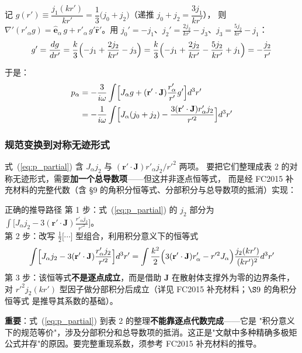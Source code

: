 记 $g(r')\equiv\dfrac{j_1(kr')}{kr'}=\dfrac13\bigl(j_0+j_2\bigr)$（递推 $j_0+j_2=\dfrac{3j_1}{kr'}$），
则 $\nabla'(r'_\alpha g)=\hat{\mathbf{e}}_\alpha\,g + r'_\alpha\,g'\hat{\mathbf{r}}'$。用
$j_0'=-j_1$、$j_2'=\frac{2j_2}{kr'}-j_3$、$j_3=\frac{5j_2}{kr'}-j_1$：
\begin{equation}
  g' = \frac{dg}{dr'} = \frac{k}{3}\Bigl(-j_1+\frac{2j_2}{kr'}-j_3\Bigr)
     = \frac{k}{3}\Bigl(-j_1+\frac{2j_2}{kr'}-\frac{5j_2}{kr'}+j_1\Bigr)
     = -\frac{j_2}{r'}
\end{equation}

于是：
\begin{align}
  p_\alpha &= -\frac{3}{i\omega}\int\Bigl[
    J_\alpha g + (\mathbf{r}'\cdot\mathbf{J})\frac{r'_\alpha}{r'}g'\Bigr]d^3r' \notag\\
  &= -\frac{1}{i\omega}\int\Bigl[
    J_\alpha(j_0+j_2) - \frac{3(\mathbf{r}'\cdot\mathbf{J})r'_\alpha j_2}{r'^2}\Bigr]d^3r'
  \label{eq:p_partial}
\end{align}

\subsubsection{规范变换到对称无迹形式}

式~(\ref{eq:p_partial}) 含 $J_\alpha j_2$ 与 $(\mathbf{r}'\cdot\mathbf{J})r'_\alpha j_2/r'^2$ 两项。
要把它们整理成表 2 的对称无迹形式，需要\textbf{加一个总导数项}——但这并非逐点恒等式，
而是经 FC2015 补充材料的完整代数（含 \S9 的角积分恒等式、分部积分与总导数项的抵消）实现：

\begin{stepbox}{正确的推导路径}
第 1 步：式~(\ref{eq:p_partial}) 的 $j_2$ 部分为 $\int\bigl[J_\alpha j_2 - 3(\mathbf{r}'\cdot\mathbf{J})\frac{r'_\alpha j_2}{r'^2}\bigr]$。\\
第 2 步：改写 $\frac{1}{2}\bigl[\cdots\bigr]$ 型组合，利用积分意义下的恒等式
$$
\int\Bigl[J_\alpha j_2 - 3(\mathbf{r}'\cdot\mathbf{J})\frac{r'_\alpha j_2}{r'^2}\Bigr]d^3r'
= \int\frac{k^2}{2}\Bigl(3(\mathbf{r}'\cdot\mathbf{J})r'_\alpha - r'^2J_\alpha\Bigr)\frac{j_2(kr')}{(kr')^2}d^3r'
$$
第 3 步：该恒等式\textbf{不是逐点成立}，而是借助 $\mathbf{J}$ 在散射体支撑外为零的边界条件，
对 $r'^2j_2(kr')$ 型因子做分部积分后成立（详见 FC2015 补充材料；$\S9$ 的角积分恒等式
是推导其系数的基础）。
\end{stepbox}

\begin{noteworthy}
\textbf{重要}：式~(\ref{eq:p_partial}) 到表 2 的整理\textbf{不能靠逐点代数完成}——它是
"积分意义下的规范等价"，涉及分部积分和总导数项的抵消。这正是"文献中多种精确多极矩
公式并存"的原因。要完整重现系数，须参考 FC2015 补充材料的推导。
\end{noteworthy}

